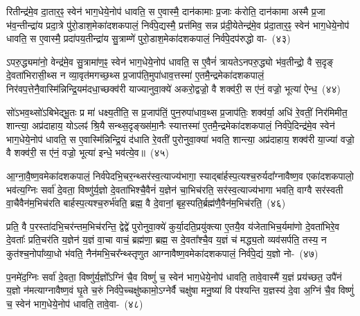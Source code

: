 रितीन्द्र॑मे॒व दा॒तार॒ꣴ॒ स्वेन॑ भाग॒धेये॒नोप॑ धावति॒ स ए॒वास्मै॒ दान॑कामाः प्र॒जाः क॑रोति॒ दान॑कामा अस्मै प्र॒जा भ॑व॒न्तीन्द्रा॑य प्रदा॒त्रे पु॑रो॒डाश॒मेका॑\-दश\-कपालं॒ निर्व॑पे॒द्यस्मै॒ प्रत्त॑मिव॒ सन्न प्र॑दी॒येतेन्द्र॑मे॒व प्र॑दा॒तार॒ꣴ॒ स्वेन॑ भाग॒धेये॒नोप॑ धावति॒ स ए॒वास्मै॒ प्रदा॑पय॒तीन्द्रा॑य सु॒त्राम्णे॑ पुरो॒डाश॒मेका॑\-दश\-कपालं॒ निर्व॑पे॒दप॑रुद्धो वा-~(४३)

ऽपरु॒द्ध्यमा॑नो॒ वेन्द्र॑मे॒व सु॒त्रामा॑ण॒ꣴ॒ स्वेन॑ भाग॒धेये॒नोप॑ धावति॒ स ए॒वैनं॑ त्रायते\-ऽनपरु॒द्ध्यो भ॑व॒तीन्द्रो॒ वै स॒दृङ् दे॒वता॑भिरासी॒थ्स न व्या॒वृत॑मगच्छ॒थ्स प्र॒जा\-प॑ति॒मुपा॑\-धाव॒त्तस्मा॑ ए॒तमै॒न्द्रमेका॑\-दश\-कपालं॒ निर॑वप॒त्तेनै॒वास्मि॑न्निन्द्रि॒य\-म॑दधा॒च्छक्व॑री याज्यानुवा॒क्ये॑ अकरो॒द्वज्रो॒ वै शक्व॑री॒ स ए॑नं॒ वज्रो॒ भूत्या॑ ऐन्ध॒~(४४)

सो॑\-ऽभव॒थ्सो॑\-ऽबिभेद्भू॒तः प्र मा॑ धक्ष्य॒तीति॒ स प्र॒जा\-प॑तिं॒ पुन॒रुपा॑धाव॒थ्स प्र॒जा\-प॑तिः॒ शक्व॑र्या॒ अधि॑ रे॒वतीं॒ निर॑मिमीत॒ शान्त्या॒ अप्र॑दाहाय॒ यो\-ऽलꣴ॑ श्रि॒यै सन्थ्स॒दृङ्ख्स॑मा॒नैः स्यात्तस्मा॑ ए॒तमै॒न्द्रमेका॑\-दश\-कपालं॒ निर्व॑पे॒दिन्द्र॑मे॒व स्वेन॑ भाग॒धेये॒नोप॑ धावति॒ स ए॒वास्मि॑न्निन्द्रि॒यं द॑धाति रे॒वती॑ पुरोनुवा॒क्या॑ भवति॒ शान्त्या॒ अप्र॑दाहाय॒ शक्व॑री या॒ज्या॑ वज्रो॒ वै शक्व॑री॒ स ए॑नं॒ वज्रो॒ भूत्या॑ इन्धे॒ भव॑त्ये॒व॥~(४५)

{\anuvakamend[{अपि॒ तꣴ स्यु॑र्वैन्ध भवति॒ चतु॑र्दश च}]}%

आ॒ग्ना॒वै॒ष्ण॒वमेका॑दशकपालं॒ निर्व॑पेदभि॒चर॒न्थ्सर॑स्व॒त्याज्य॑\-भागा॒ स्याद्बा॑र्\mbox{}हस्प॒त्यश्च॒रुर्यदा᳚ग्नावैष्ण॒व एका॑\-दश\-कपालो॒ भव॑त्य॒ग्निः सर्वा॑ दे॒वता॒ विष्णु॑र्य॒ज्ञो दे॒वता॑भिश्चै॒वैनं॑ य॒ज्ञेन॑ चा॒भिच॑रति॒ सर॑स्व॒त्याज्य॑भागा भवति॒ वाग्वै सर॑स्वती वा॒चैवैन॑म॒भिच॑रति बार्\mbox{}हस्प॒त्यश्च॒रुर्भ॑वति॒ ब्रह्म॒ वै दे॒वानां॒ बृह॒स्पति॒र्ब्रह्म॑णै॒वैन॑म॒भिच॑रति॒~(४६)

प्रति॒ वै प॒रस्ता॑दभि॒चर॑न्तम॒भिच॑रन्ति॒ द्वेद्वे॑ पुरोनुवा॒क्ये॑ कुर्या॒दति॒प्रयु॑क्त्या ए॒तयै॒व य॑जेताभिच॒र्यमा॑णो दे॒वता॑भिरे॒व दे॒वताः᳚ प्रति॒चर॑ति य॒ज्ञेन॑ य॒ज्ञं वा॒चा वाचं॒ ब्रह्म॑णा॒ ब्रह्म॒ स दे॒वता᳚श्चै॒व य॒ज्ञं च॑ मद्ध्य॒तो व्यव॑सर्पति॒ तस्य॒ न कुत॑श्च॒नोपा᳚व्या॒धो भ॑वति॒ नैन॑मभि॒चर᳚न्थ्स्तृणुत आग्नावैष्ण॒वमेका॑\-दश\-कपालं॒ निर्व॑पे॒द्यं य॒ज्ञो नो-~(४७)

प॒नमे॑द॒ग्निः सर्वा॑ दे॒वता॒ विष्णु॑र्य॒ज्ञो᳚\-ऽग्निं चै॒व विष्णुं॑ च॒ स्वेन॑ भाग॒धेये॒नोप॑ धावति॒ तावे॒वास्मै॑ य॒ज्ञं प्रय॑च्छत॒ उपै॑नं य॒ज्ञो न॑मत्याग्नावैष्ण॒वं घृ॒ते च॒रुं निर्व॑पे॒च्चक्षु॑ष्कामो॒\-ऽग्नेर्वै चक्षु॑षा मनु॒ष्या॑ वि प॑श्यन्ति य॒ज्ञस्य॑ दे॒वा अ॒ग्निं चै॒व विष्णुं॑ च॒ स्वेन॑ भाग॒धेये॒नोप॑ धावति॒ तावे॒वा-~(४८)

